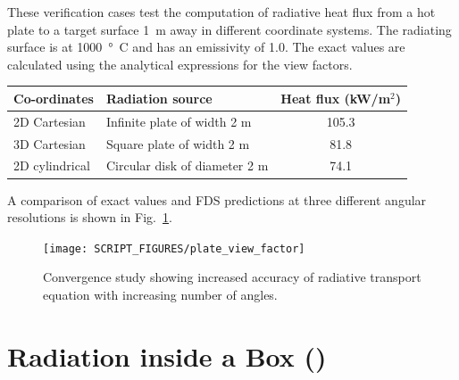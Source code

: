 \documentclass[11pt]{book}
\begin{document}
These verification cases test the computation of radiative heat flux from a hot plate to a target surface 1~m away in different coordinate systems. The radiating surface is at 1000~\si{\degree C} and has an emissivity of 1.0.  The exact values are calculated using the analytical expressions for the view factors.
\begin{center}
\begin{tabular}{|l|l|c|}
\hline Co-ordinates & Radiation source & Heat flux (kW/m$^2$)  \\ \hline \hline
2D Cartesian   & Infinite plate of width 2 m   & 105.3 \\
3D Cartesian   & Square plate of width 2 m     & 81.8 \\
2D cylindrical & Circular disk of diameter 2 m & 74.1 \\ \hline
\end{tabular}
\end{center}
A comparison of exact values and FDS predictions at three different angular resolutions is shown in Fig.~\ref{fig_plate_view_factor}.
\begin{figure}[ht]
\centering
\texttt{[image: SCRIPT\_FIGURES/plate\_view\_factor]}
\caption[The {\ct plate\_view\_factor} test case]{Convergence study showing increased accuracy of radiative transport equation with increasing number of angles.}
\label{fig_plate_view_factor}
\end{figure}



\section{Radiation inside a Box (\texorpdfstring{}{radiation\_box}) }
\label{radiation_in_a_box}
\label{radiation_box}
\end{document}
